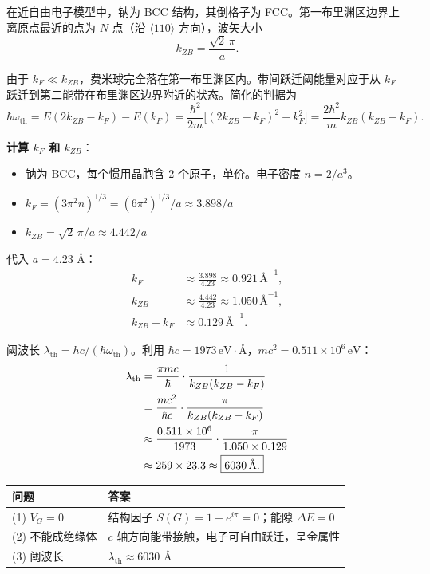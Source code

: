 \begin{derivationbox}[标准解题过程]
在近自由电子模型中，钠为 BCC 结构，其倒格子为 FCC。第一布里渊区边界上离原点最近的点为 $N$ 点（沿 $\langle110\rangle$ 方向），波矢大小
\begin{equation}
k_{ZB}=\frac{\sqrt{2}\,\pi}{a}.
\end{equation}

由于 $k_F\ll k_{ZB}$，费米球完全落在第一布里渊区内。带间跃迁阈能量对应于从 $k_F$ 跃迁到第二能带在布里渊区边界附近的状态。简化的判据为
\begin{equation}
\hbar\omega_{\text{th}}=E(2k_{ZB}-k_F)-E(k_F)
=\frac{\hbar^2}{2m}\bigl[(2k_{ZB}-k_F)^2-k_F^2\bigr]
=\frac{2\hbar^2}{m}k_{ZB}(k_{ZB}-k_F).
\end{equation}

\textbf{计算 $k_F$ 和 $k_{ZB}$}：
\begin{itemize}
    \item 钠为 BCC，每个惯用晶胞含 2 个原子，单价。电子密度 $n=2/a^3$。
    \item $k_F=(3\pi^2n)^{1/3}=(6\pi^2)^{1/3}/a\approx 3.898/a$
    \item $k_{ZB}=\sqrt{2}\,\pi/a\approx 4.442/a$
\end{itemize}

代入 $a=4.23$ \AA：
\begin{align}
k_F&\approx\frac{3.898}{4.23}\approx0.921\,\text{\AA}^{-1},\\
k_{ZB}&\approx\frac{4.442}{4.23}\approx1.050\,\text{\AA}^{-1},\\
k_{ZB}-k_F&\approx0.129\,\text{\AA}^{-1}.
\end{align}

阈波长 $\lambda_{\text{th}}=hc/(\hbar\omega_{\text{th}})$。利用 $\hbar c=1973\,\text{eV}\cdot\text{\AA}$，$mc^2=0.511\times10^6\,\text{eV}$：
\begin{align}
\lambda_{\text{th}}
&=\frac{\pi mc}{\hbar}\cdot\frac{1}{k_{ZB}(k_{ZB}-k_F)} \notag\\
&=\frac{mc^2}{\hbar c}\cdot\frac{\pi}{k_{ZB}(k_{ZB}-k_F)} \notag\\
&\approx\frac{0.511\times10^6}{1973}\cdot\frac{\pi}{1.050\times0.129}\notag\\
&\approx259\times23.3\approx\boxed{6030\,\text{\AA}.}
\end{align}
\end{derivationbox}

\begin{formulabox}[答案汇总]
\begin{center}
\begin{tabular}{ll}
\toprule
\textbf{问题} & \textbf{答案} \\
\midrule
(1) $V_G=0$ & 结构因子 $S(G)=1+e^{i\pi}=0$；能隙 $\Delta E=0$ \\
(2) 不能成绝缘体 & $c$ 轴方向能带接触，电子可自由跃迁，呈金属性 \\
(3) 阈波长 & $\lambda_{\text{th}}\approx 6030$ \AA \\
\bottomrule
\end{tabular}
\end{center}
\end{formulabox}


